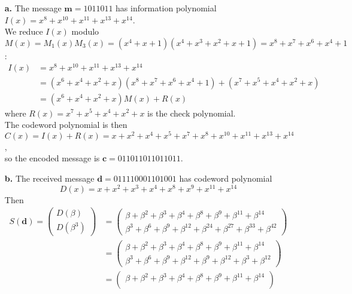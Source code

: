 \documentclass[11pt]{article}
\renewcommand{\vec}[1]{\mathbf{#1}}
\newcommand{\vc}[1]{\begin{pmatrix}#1\end{pmatrix}}
\begin{document}
\begin{itemize}
      \item[{\bf a.}]  The message $\vec{m} = \text{1011011}$ has
                  information polynomial $I(x) = x^8 + x^{10} + x^{11} + x^{13} + x^{14}$.\\
                  We reduce $I(x)$ modulo
                  $M(x) = M_1(x)M_3(x) = (x^4+x+1)(x^4+x^3+x^2+x+1) = x^8+x^7+x^6+x^4+1$:
                   \begin{align*}
                     I(x) &=  x^8 + x^{10} + x^{11} + x^{13} + x^{14}\\
                          &= (x^6+x^4+x^2+x)(x^8+x^7+x^6+x^4+1) + (x^7+x^5+x^4+x^2+x)\\
                          &= (x^6+x^4+x^2+x) M(x) + R(x)
                   \end{align*}
                   where $R(x) = x^7+x^5+x^4+x^2+x$ is the check polynomial.\\
                   The codeword polynomial is then
                   $C(x) = I(x) + R(x) = x + x^2 + x^4 + x^5 + x^7 + x^8 + x^{10} + x^{11} + x^{13} + x^{14}$,\\
                   so the encoded message is $\vec{c} = \text{011011011011011}$.
      \item[{\bf b.}]    The received message    $\vec{d} = \text{011110001101001}$
                   has codeword polynomial
                   \[
                     D(x) = x + x^2 + x^3 + x^4 + x^8 + x^9 + x^{11} + x^{14}
                   \]
                   Then
                   \begin{align*}
                     S(\vec{d}) = \vc{D(\beta)\\
                                      D(\beta^3)}
                               &= \vc{\beta   + \beta^2 + \beta^3 + \beta^4    + \beta^8    + \beta^9    + \beta^{11} + \beta^{14}\\
                                      \beta^3 + \beta^6 + \beta^9 + \beta^{12} + \beta^{24} + \beta^{27} + \beta^{33} + \beta^{42}}\\
                               &= \vc{\beta   + \beta^2 + \beta^3 + \beta^4    + \beta^8    + \beta^9    + \beta^{11} + \beta^{14}\\
                                      \beta^3 + \beta^6 + \beta^9 + \beta^{12} + \beta^9    + \beta^{12} + \beta^3    + \beta^{12}}\\
                               &= \vc{\beta   + \beta^2 + \beta^3 + \beta^4    + \beta^8    + \beta^9    + \beta^{11} + \beta^{14}\\
}
\end{align*}
\end{itemize}
\end{document}
